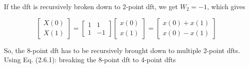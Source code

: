 \documentclass[journal,12pt,twocolumn]{IEEEtran}
\renewcommand\thesection{\arabic{section}}
\begin{document}
\begin{enumerate}[label=\thesection.\arabic*.,ref=\thesection.\theenumi]
If the dft is recursively broken down to 2-point dft, we get
$ W_{2} = -1 $, which gives 

\begin{equation}
\begin{bmatrix}
X(0) \\
X(1)
\end{bmatrix}
=
\begin{bmatrix}
1&1\\
1&-1
\end{bmatrix}
\begin{bmatrix}
x(0) \\ 
x(1) 
\end{bmatrix}
=
\begin{bmatrix}
x(0)+x(1) \\
x(0)-x(1)
\end{bmatrix}
\end{equation}

So, the 8-point dft has to be recursively brought down to multiple 2-point dfts.\bigskip \\ 
Using Eq. (2.6.1): breaking the 8-point dft to 4-point dfts


\end{enumerate}
\end{document}
